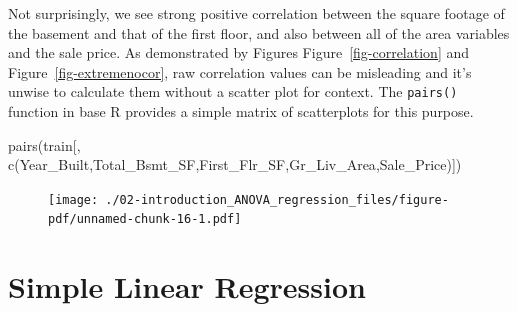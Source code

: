 \documentclass[
  letterpaper,
  DIV=11,
  numbers=noendperiod]{scrreprt}
\newenvironment{Shaded}{\begin{snugshade}}{\end{snugshade}}
\newcommand{\FunctionTok}[1]{\textcolor[rgb]{0.28,0.35,0.67}{#1}}
\newcommand{\NormalTok}[1]{\textcolor[rgb]{0.00,0.23,0.31}{#1}}
\newcommand{\StringTok}[1]{\textcolor[rgb]{0.13,0.47,0.30}{#1}}
\begin{document}
Not surprisingly, we see strong positive correlation between the square
footage of the basement and that of the first floor, and also between
all of the area variables and the sale price. As demonstrated by Figures
Figure~\ref{fig-correlation} and Figure~\ref{fig-extremenocor}, raw
correlation values can be misleading and it's unwise to calculate them
without a scatter plot for context. The \texttt{pairs()} function in
base R provides a simple matrix of scatterplots for this purpose.

\begin{Shaded}
\begin{Highlighting}[]
\FunctionTok{pairs}\NormalTok{(train[, }\FunctionTok{c}\NormalTok{(}\StringTok{\textquotesingle{}Year\_Built\textquotesingle{}}\NormalTok{,}\StringTok{\textquotesingle{}Total\_Bsmt\_SF\textquotesingle{}}\NormalTok{,}\StringTok{\textquotesingle{}First\_Flr\_SF\textquotesingle{}}\NormalTok{,}\StringTok{\textquotesingle{}Gr\_Liv\_Area\textquotesingle{}}\NormalTok{,}\StringTok{\textquotesingle{}Sale\_Price\textquotesingle{}}\NormalTok{)])}
\end{Highlighting}
\end{Shaded}

\begin{figure}[H]

{\centering \texttt{[image: ./02-introduction\_ANOVA\_regression\_files/figure-pdf/unnamed-chunk-16-1.pdf]}

}

\end{figure}

\hypertarget{simple-linear-regression}{%
\section{Simple Linear Regression}\label{simple-linear-regression}}
\end{document}
